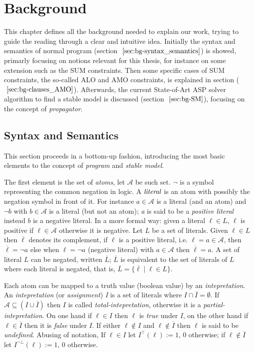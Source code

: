 \chapter{Background}

This chapter defines all the background needed to explain our work,
trying to guide the reading through a clear and intuitive idea.
Initially the syntax and semantics of normal
program (section $~\ref{sec:bg-syntax_semantics}$) is showed,
primarly focusing on notions relevant for this thesis, for instance on some
extension such as the SUM constraints.
Then some specific cases of SUM constraints, the so-called ALO and AMO constraints, 
is explained in section ($~\ref{sec:bg-clauses_AMO}$).
Afterwards, the current State-of-Art ASP solver algorithm to find a stable model 
is discussed (section $~\ref{sec:bg-SM}$), focusing on the concept of \textit{propagator}.

\section{Syntax and Semantics}
\label{sec:bg-syntax_semantics}

This section proceeds in a bottom-up fashion, introducing the 
most basic elements to the concept of \textit{program}
and \textit{stable model}.

The first element is the set of \textit{atoms}, let $\mathcal{A}$ be such set.
$\neg$ is a symbol representing the common negation in logic.
A $\emph{literal}$ is an atom with possibly the negation symbol in front of it.
For instance $a \in \mathcal{A}$ is a literal (and an atom) and $\neg b$ with $b \in \mathcal{A}$
is a literal (but not an atom); \textit{a} is said to be a \textit{positive literal} instead
$b$ is a negative literal. In a more formal way: given a literal $\ell \in L$, $\ell$ is 
positive if $\ell \in \mathcal{A}$ otherwise it is negative. Let $L$ be a set of literals.
Given $\ell \in L$ then $\overline{\ell}$ denotes its complement, if $\ell$ is a positive
literal, i.e. $\ell = a \in \mathcal{A}$, then $\overline{\ell} = \neg a$ else 
when $\ell = \neg a$ (negative literal) with $a \in \mathcal{A}$ then $\overline{\ell} = a$.
A set of literal $L$ can be negated, written $\overline{L}$;
$\overline{L}$ is equivalent to the set of literals of $L$ where each literal is negated,
that is, $\overline{L} = \{ \overline{\ell} \mid \ell \in L \}$.

Each atom can be mapped to a truth value (boolean value) by an \textit{intepretation}.
An \textit{intepretation} (or \textit{assignment}) \textit{I} is a set of 
literals where $I \cap \overline{I} = \emptyset$.
If $\mathcal{A} \subseteq (I \cup \overline{I})$ then $I$ is called \textit{total-intepretation},
otherwise it is a \textit{partial-intepretation}.
On one hand if $\ell \in I$ then $\ell$ is \textit{true} under $I$, on the other hand 
if $\ell \in \overline{I}$ then it is \textit{false} under $I$.
If either $\ell \not\in I$ and $\ell \not\in \overline{I}$ then $\ell$ is said to be \textit{undefined}. 
Abusing of notation, If $\ell \in I$ let $I^{\top}(\ell) := 1$, 0 otherwise;
if $\ell \not\in \overline{I}$ let $I^{\neg\bot}(\ell) := 1$, 0 otherwise.

